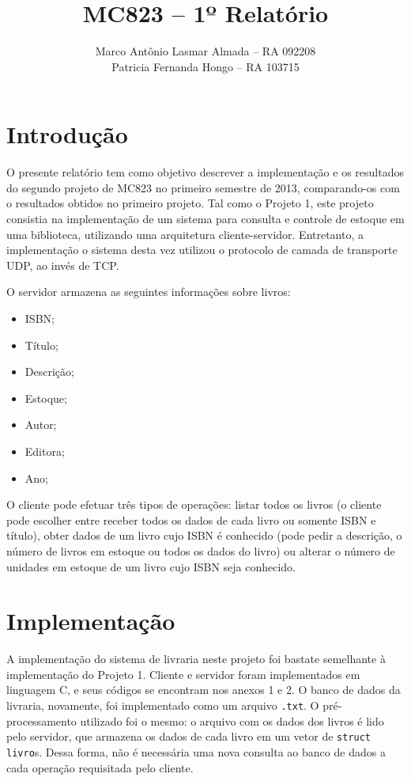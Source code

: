 \documentclass[11pt, brazil]{article} %
\title{MC823 -- 1º Relatório}
\author{Marco Antônio Lasmar Almada -- RA 092208 \\ Patricia Fernanda Hongo -- RA 103715}
\date{} %
\begin{document}
\maketitle

\section{Introdução}

O presente relatório tem como objetivo descrever a implementação e os resultados do segundo projeto de MC823 no primeiro semestre de 2013, comparando-os com o resultados obtidos no primeiro projeto. Tal como o Projeto 1, este projeto consistia na implementação de um sistema para consulta e controle de estoque em uma biblioteca, utilizando uma arquitetura cliente-servidor. Entretanto, a implementação o sistema desta vez utilizou o protocolo de camada de transporte UDP, ao invés de TCP.

O servidor armazena as seguintes informações sobre livros:
\begin{itemize}
  \item ISBN;
  \item Título;
  \item Descrição;
  \item Estoque;
  \item Autor;
  \item Editora;
  \item Ano;  
\end{itemize}

O cliente pode efetuar três tipos de operações: listar todos os livros (o cliente pode escolher entre receber todos os dados de cada livro ou somente ISBN e título), obter dados de um livro cujo ISBN é conhecido (pode pedir a descrição, o número de livros em estoque ou todos os dados do livro) ou alterar o número de unidades em estoque de um livro cujo ISBN seja conhecido.

\section{Implementação}


A implementação do sistema de livraria neste projeto foi bastate semelhante à implementação do Projeto 1.
Cliente e servidor foram implementados em linguagem C, e seus códigos se encontram nos anexos 1 e 2. O banco de dados da livraria, novamente, foi implementado como um arquivo \texttt{.txt}.
O pré-processamento utilizado foi o mesmo: o arquivo com os dados dos livros é lido pelo servidor, que armazena os dados de cada livro em um vetor de \texttt{struct livro}s.
Dessa forma, não é necessária uma nova consulta ao banco de dados a cada operação requisitada pelo cliente.
\end{document}

